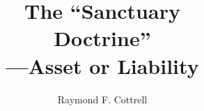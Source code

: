 \documentclass{tufte-book}
\title{The ``Sanctuary\\Doctrine''\\---Asset or Liability}
\author{Raymond F. Cottrell}
\newcommand{\blankpage}{\newpage\hbox{}\thispagestyle{empty}\newpage}
\begin{document}
\frontmatter

\blankpage

\maketitle

\tableofcontents

\listoftables

\cleardoublepage



\mainmatter






\backmatter

\renewcommand{\bibpreamble}{Most of my papers cited in the following notes are 
on file in the Heritage
Room of the Del E.\ Webb Library on the campus of Loma Linda University. The
Association of Adventist Forums is currently planning a website and has
requested a list of all my major papers.}




\end{document}
